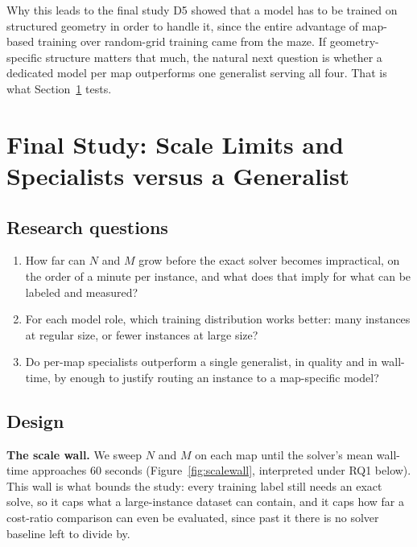 \documentclass[11pt,a4paper]{article}
\begin{document}
\begin{findingbox}{Why this leads to the final study}
D5 showed that a model has to be trained on structured geometry in order to handle it, since the
entire advantage of map-based training over random-grid training came from the maze. If
geometry-specific structure matters that much, the natural next question is whether a dedicated
model per map outperforms one generalist serving all four. That is what Section~\ref{sec:final}
tests.
\end{findingbox}

\section{Final Study: Scale Limits and Specialists versus a Generalist}
\label{sec:final}

\subsection{Research questions}

\begin{enumerate}[label=\textbf{RQ\arabic*.}]
  \item How far can $N$ and $M$ grow before the exact solver becomes impractical, on the order of a
        minute per instance, and what does that imply for what can be labeled and measured?
  \item For each model role, which training distribution works better: many instances at regular
        size, or fewer instances at large size?
  \item Do per-map specialists outperform a single generalist, in quality and in wall-time, by
        enough to justify routing an instance to a map-specific model?
\end{enumerate}

\subsection{Design}

\textbf{The scale wall.} We sweep $N$ and $M$ on each map until the solver's mean wall-time
approaches 60 seconds (Figure~\ref{fig:scalewall}, interpreted under RQ1 below). This wall is what
bounds the study: every training label still needs an exact solve, so it caps what a large-instance
dataset can contain, and it caps how far a cost-ratio comparison can even be evaluated, since past
it there is no solver baseline left to divide by.
\end{document}

